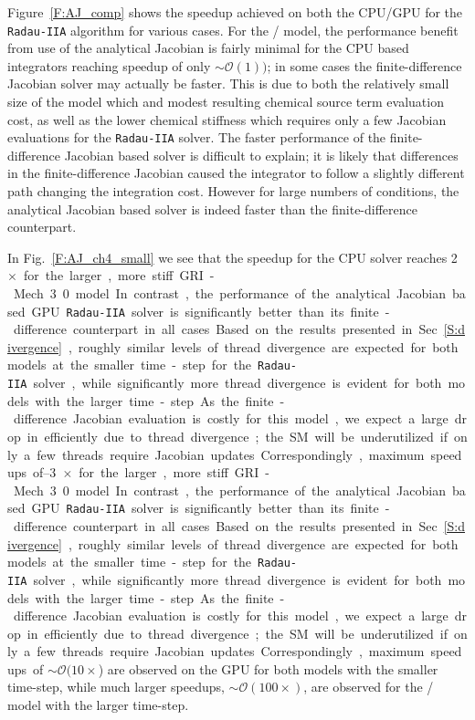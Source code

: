 \documentclass[final,twocolumn]{elsarticle}
\begin{document}
Figure~\ref{F:AJ_comp} shows the speedup achieved on both the CPU\slash GPU for the \texttt{Radau-IIA} algorithm for various cases.
For the \slash{} model, the performance benefit from use of the analytical Jacobian is fairly minimal for the CPU based integrators reaching speedup of only $\sim\mathcal{O}(1))$; in some cases the finite-difference Jacobian solver may actually be faster.
This is due to both the relatively small size of the model which and modest resulting chemical source term evaluation cost, as well as the lower chemical stiffness which requires only a few Jacobian evaluations for the \texttt{Radau-IIA} solver.
The faster performance of the finite-difference Jacobian based solver is difficult to explain; it is likely that differences in the finite-difference Jacobian caused the integrator to follow a slightly different path changing the integration cost.
However for large numbers of conditions, the analytical Jacobian based solver is indeed faster than the finite-difference counterpart.

In Fig.~\ref{F:AJ_ch4_small} we see that the speedup for the CPU solver reaches \SIrange{2}{3}{$\times$} for the larger, more stiff GRI-Mech 3.0 model.
In contrast, the performance of the analytical Jacobian based GPU \texttt{Radau-IIA} solver is significantly better than its finite-difference counterpart in all cases.
Based on the results presented in Sec.~\ref{S:divergence}, roughly similar levels of thread divergence are expected for both models at the smaller time-step for the \texttt{Radau-IIA} solver, while significantly more thread divergence is evident for both models with the larger time-step.
As the finite-difference Jacobian evaluation is costly for this model, we expect a large drop in efficiently due to thread divergence; the SM will be underutilized if only a few threads require Jacobian updates.
Correspondingly, maximum speedups of $\sim\mathcal{O}(10\times$) are observed on the GPU for both models with the smaller time-step, while much larger speedups, $\sim\mathcal{O}(100\times)$, are observed for the \slash{} model with the larger time-step.
\end{document}
